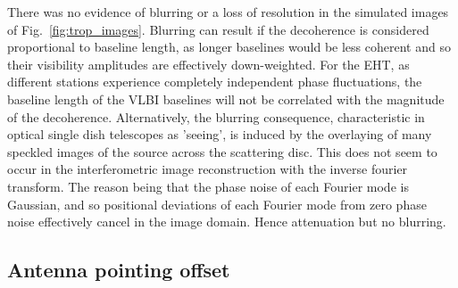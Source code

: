 There was no evidence of blurring or a loss of resolution in the simulated images of Fig.~\ref{fig:trop_images}. Blurring can result if the decoherence is considered proportional to baseline length, as longer baselines would be less coherent and so their visibility amplitudes are effectively down-weighted. For the EHT, as different stations experience completely independent phase fluctuations, the baseline length of the VLBI baselines will not be correlated with the magnitude of the decoherence. Alternatively, the blurring consequence, characteristic in optical single dish telescopes as 'seeing', is induced by the overlaying of many speckled images of the source \citep{Narayan_1992} across the scattering disc. This does not seem to occur in the interferometric image reconstruction with the inverse fourier transform. The reason being that the phase noise of each Fourier mode is Gaussian, and so positional deviations of each Fourier mode from zero phase noise effectively cancel in the image domain. Hence attenuation but no blurring.




\subsection{Antenna pointing offset}



